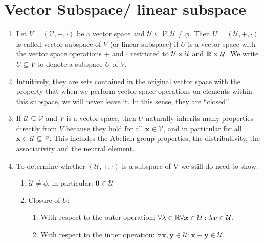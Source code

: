 \section{Vector Subspace/ linear subspace}


\begin{enumerate}
    \item
    \begin{definition}
        Let $V = (\mathcal{V}, +, \cdot )$ be a vector space and $\mathcal{U} \subseteq \mathcal{V}, \mathcal{U} \neq \phi$.
        Then $U = (\mathcal{U}, +, \cdot )$ is called vector subspace of $V$ (or linear subspace) if $U$ is a vector space with the vector space operations $+$ and $\cdot$  restricted to $\mathcal{U} \times \mathcal{U}$ and $\mathbb{R} \times \mathcal{U}$.
        We write $U \subseteq V$ to denote a subspace $U$ of $V$.
        \hfill \cite{mfml/book/mml/Deisenroth-Faisal-Ong}
    \end{definition}

    \item Intuitively, they are sets contained in the original vector space with the property that when we perform vector space operations on elements within this subspace, we will never leave it.
    In this sense, they are “closed”.
    \hfill \cite{mfml/book/mml/Deisenroth-Faisal-Ong}

    \item If $\mathcal{U} \subseteq \mathcal{V}$ and $V$ is a vector space, then $U$ naturally inherits many properties directly from $V$ because they hold for all $\bm{x} \in \mathcal{V}$, and in particular for all $\bm{x} \in \mathcal{U} \subseteq \mathcal{V}$.
    This includes the Abelian group properties, the distributivity, the associativity and the neutral element.
    \hfill \cite{mfml/book/mml/Deisenroth-Faisal-Ong}

    \item To determine whether $(\mathcal{U}, +, \cdot)$ is a subspace of V we still do need to show:
    \begin{enumerate}
        \item $\mathcal{U} \neq \phi$, in particular: $\bm{0} \in \mathcal{U}$
        \hfill \cite{mfml/book/mml/Deisenroth-Faisal-Ong}

        \item Closure of $U$:
        \begin{enumerate}
            \item With respect to the outer operation: $\forall \lambda  \in  \mathbb{R} \forall \bm{x} \in  \mathcal{U} : \lambda \bm{x} \in  \mathcal{U}$.
            \hfill \cite{mfml/book/mml/Deisenroth-Faisal-Ong}

            \item With respect to the inner operation: $\forall \bm{x}, \bm{y} \in  \mathcal{U} : \bm{x} + \bm{y} \in  \mathcal{U}$.
            \hfill \cite{mfml/book/mml/Deisenroth-Faisal-Ong}
        \end{enumerate}
    \end{enumerate}

\end{enumerate}


